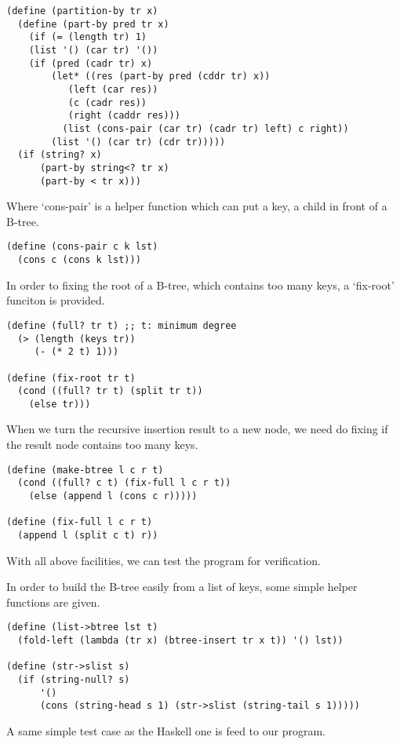 \documentclass{article}
\begin{document}
\begin{lstlisting}
(define (partition-by tr x)
  (define (part-by pred tr x)
    (if (= (length tr) 1)
	(list '() (car tr) '())
	(if (pred (cadr tr) x)
	    (let* ((res (part-by pred (cddr tr) x))
		   (left (car res))
		   (c (cadr res))
		   (right (caddr res)))
	      (list (cons-pair (car tr) (cadr tr) left) c right))
	    (list '() (car tr) (cdr tr)))))
  (if (string? x)
      (part-by string<? tr x)
      (part-by < tr x)))
\end{lstlisting}

Where `cons-pair' is a helper function which can put a key, a
child in front of a B-tree.

\begin{lstlisting}
(define (cons-pair c k lst)
  (cons c (cons k lst)))
\end{lstlisting}

In order to fixing the root of a B-tree, which contains too many
keys, a `fix-root' funciton is provided.

\begin{lstlisting}
(define (full? tr t) ;; t: minimum degree
  (> (length (keys tr)) 
     (- (* 2 t) 1)))

(define (fix-root tr t)
  (cond ((full? tr t) (split tr t))
	(else tr)))
\end{lstlisting}

When we turn the recursive insertion result to a new node, we
need do fixing if the result node contains too many keys.

\begin{lstlisting}
(define (make-btree l c r t)
  (cond ((full? c t) (fix-full l c r t))
	(else (append l (cons c r)))))

(define (fix-full l c r t)
  (append l (split c t) r))
\end{lstlisting}

With all above facilities, we can test the program for verification.

In order to build the B-tree easily from a list of keys, some simple
helper functions are given.

\begin{lstlisting}
(define (list->btree lst t)
  (fold-left (lambda (tr x) (btree-insert tr x t)) '() lst))

(define (str->slist s)
  (if (string-null? s)
      '()
      (cons (string-head s 1) (str->slist (string-tail s 1)))))
\end{lstlisting}

A same simple test case as the Haskell one is feed to our program.
\end{document}
